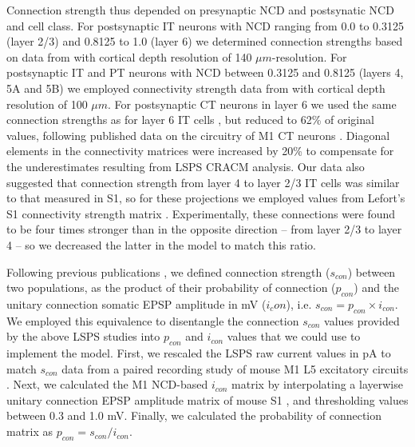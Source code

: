 Connection strength thus depended on presynaptic NCD and postsynatic NCD and cell class. For postsynaptic IT neurons with NCD ranging from 0.0 to 0.3125 (layer 2/3) and 0.8125 to 1.0 (layer 6) we determined connection strengths based on data from \cite{Weil08} with cortical depth resolution of 140 $\mu m$-resolution. For postsynaptic IT and PT neurons with NCD between 0.3125 and 0.8125 (layers 4, 5A and 5B) we employed connectivity strength data from \cite{Ande10} with cortical depth resolution of 100 $\mu m$. For postsynaptic CT neurons in layer 6 we used the same connection strengths as for layer 6 IT cells \cite{Weil08}, but reduced to 62\% of original values, following published data on the circuitry of M1 CT neurons \cite{Yama15b}. Diagonal elements in the connectivity matrices were increased by 20\% to compensate for the underestimates resulting from LSPS CRACM analysis. Our data \cite{Yama15b} also suggested that connection strength from layer 4 to layer 2/3 IT cells was similar to that measured in S1, so for these projections we employed values from Lefort's S1 connectivity strength matrix \cite{Lefo09}. Experimentally, these connections were found to be four times stronger than in the opposite direction -- from layer 2/3 to layer 4 -- so we decreased the latter in the model to match this ratio.

Following previous publications \cite{Kiri12,Lefo09}, we defined connection strength ($s_{con}$) between two populations, as the product of their probability of connection ($p_{con}$) and the unitary connection somatic EPSP amplitude in mV ($i_con$), i.e. $s_{con} = p_{con} \times i_{con}$. We employed this equivalence to disentangle the connection $s_{con}$ values provided by the above LSPS studies into $p_{con}$ and $i_{con}$ values that we could use to implement the model. First, we rescaled the LSPS raw current values in pA \cite{Ande10,Weil08,Yama15,Yama15b} to match $s_{con}$ data from a paired recording study of mouse M1 L5 excitatory circuits \cite{Kiri12}. Next, we calculated the M1 NCD-based $i_{con}$ matrix by interpolating a layerwise unitary connection EPSP amplitude matrix of mouse S1 \cite{Lefo09}, and thresholding values between 0.3 and 1.0 mV. Finally, we calculated the probability of connection matrix as $p_{con} = s_{con} / i_{con}$.  

